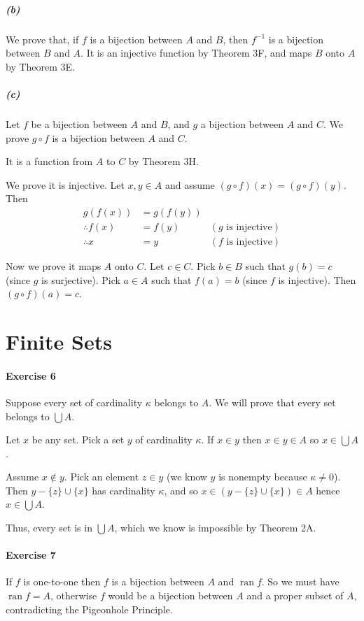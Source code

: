 \documentclass{report}
\newcommand{\ran}{\ensuremath{\operatorname{ran}}}
\newcommand{\inv}[1]{\ensuremath{{#1}^{-1}}}
\begin{document}
    \subparagraph{(b)}
    We prove that, if $f$ is a bijection between $A$ and $B$, then $\inv{f}$ is a bijection between
    $B$ and $A$. It is an injective function by Theorem 3F, and maps $B$ onto $A$ by Theorem 3E.

    \subparagraph{(c)}
    Let $f$ be a bijection between $A$ and $B$, and $g$ a bijection between $A$ and $C$. We prove $g \circ f$
    is a bijection between $A$ and $C$.

    It is a function from $A$ to $C$ by Theorem 3H.

    We prove it is injective. Let $x,y \in A$ and assume $(g \circ f)(x) = (g \circ f)(y)$. Then
    \begin{align*}
        g(f(x)) & = g(f(y)) \\
        \therefore f(x) & = f(y) & (\text{$g$ is injective}) \\
        \therefore x & = y & (\text{$f$ is injective})
    \end{align*}

    Now we prove it maps $A$ onto $C$. Let $c \in C$. Pick $b \in B$ such that $g(b) = c$
    (since $g$ is surjective). Pick
    $a \in A$ such that $f(a) = b$ (since $f$ is injective). Then $(g \circ f)(a) = c$.

    \section{Finite Sets}

    \paragraph{Exercise 6}
    Suppose every set of cardinality $\kappa$ belongs to $A$. We will prove that every set belongs to
    $\bigcup A$.

    Let $x$ be any set. Pick a set $y$ of cardinality $\kappa$. If $x \in y$ then $x \in y \in A$
    so $x \in \bigcup A$.
    
    Assume $x \notin y$. Pick an element $z \in y$ (we know
    $y$ is nonempty because $\kappa \neq 0$). Then $y - \{ z \} \cup \{ x \}$ has cardinality $\kappa$,
    and so $x \in (y - \{z\} \cup \{x\}) \in A$ hence $x \in \bigcup A$.

    Thus, every set is in $\bigcup A$, which we know is impossible by Theorem 2A.

    \paragraph{Exercise 7}
    If $f$ is one-to-one then $f$ is a bijection between $A$ and $\ran f$. So we must have $\ran f = A$, otherwise $f$ would be a bijection between $A$
    and a proper subset of $A$, contradicting the Pigeonhole Principle.
\end{document}
